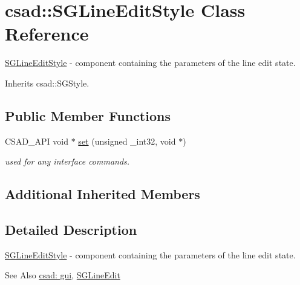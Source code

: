 \hypertarget{classcsad_1_1_s_g_line_edit_style}{\section{csad\-:\-:S\-G\-Line\-Edit\-Style Class Reference}
\label{classcsad_1_1_s_g_line_edit_style}
}


\hyperlink{classcsad_1_1_s_g_line_edit_style}{S\-G\-Line\-Edit\-Style} -\/ component containing the parameters of the line edit state.  




Inherits csad\-::\-S\-G\-Style.

\subsection*{Public Member Functions}
\begin{DoxyCompactItemize}
\item 
\hypertarget{classcsad_1_1_s_g_line_edit_style_a0e6084eeae9c28da54c1d04f3c56e04e}{C\-S\-A\-D\-\_\-\-A\-P\-I void $\ast$ \hyperlink{classcsad_1_1_s_g_line_edit_style_a0e6084eeae9c28da54c1d04f3c56e04e}{set} (unsigned \-\_\-int32, void $\ast$)}\label{classcsad_1_1_s_g_line_edit_style_a0e6084eeae9c28da54c1d04f3c56e04e}

\begin{DoxyCompactList}\small\item\em used for any interface commands. \end{DoxyCompactList}\end{DoxyCompactItemize}
\subsection*{Additional Inherited Members}


\subsection{Detailed Description}
\hyperlink{classcsad_1_1_s_g_line_edit_style}{S\-G\-Line\-Edit\-Style} -\/ component containing the parameters of the line edit state. 

\begin{DoxySeeAlso}{See Also}
\hyperlink{group__scenegui}{csad\-: gui}, \hyperlink{classcsad_1_1_s_g_line_edit}{S\-G\-Line\-Edit} 
\end{DoxySeeAlso}
